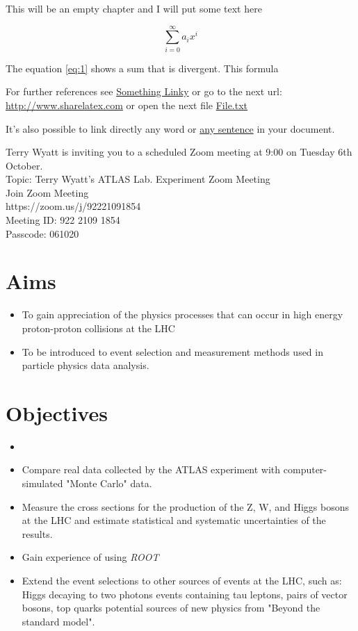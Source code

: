 \documentclass[11pt]{article}
\newcommand{\<}{\guilsinglleft}
\renewcommand{\>}{\guilsinglright}
\renewcommand{\it}[1]{\textit{#1}}
\begin{document}
    This will be an empty chapter and I will put some text here

    \begin{equation}
        \label{eq:1}
        \sum_{i=0}^{\infty} a_i x^i
    \end{equation}

    The equation \ref{eq:1} shows a sum that is divergent. This formula

    For further references see \href{http://www.sharelatex.com}{Something
    Linky} or go to the next url: \url{http://www.sharelatex.com} or open
    the next file \href{run:./file.txt}{File.txt}

    It's also possible to link directly any word or
    \hyperlink{thesentence}{any sentence} in your document.

    Terry Wyatt is inviting you to a scheduled Zoom meeting at 9:00 on Tuesday 6th October.\\
    Topic: Terry Wyatt's ATLAS Lab. Experiment Zoom Meeting\\
    Join Zoom Meeting\\
    https://zoom.us/j/92221091854\\
    Meeting ID: 922 2109 1854\\
    Passcode: 061020\\
    \section{Aims}
    \begin{itemize}
        \item To gain appreciation of the physics processes that can occur in high energy proton-proton collisions at the LHC
        \item To be introduced to event selection and measurement methods used in particle physics data analysis.
    \end{itemize}

    \section{Objectives}
    \begin{itemize}
        \item
        \item Compare real data collected by the ATLAS experiment with computer-simulated "Monte Carlo" data.
        \item Measure the cross sections for the production of the Z, W, and Higgs bosons at the LHC and estimate
        statistical and systematic uncertainties of the results.
        \item Gain experience of using \it{ROOT}
        \item Extend the event selections to other sources of events at the LHC, such as:
        \subitem Higgs decaying to two photons
        \subitem events containing tau leptons, pairs of vector bosons, top quarks
        \subitem potential sources of new physics from "Beyond the standard model".
    \end{itemize}
\end{document}
